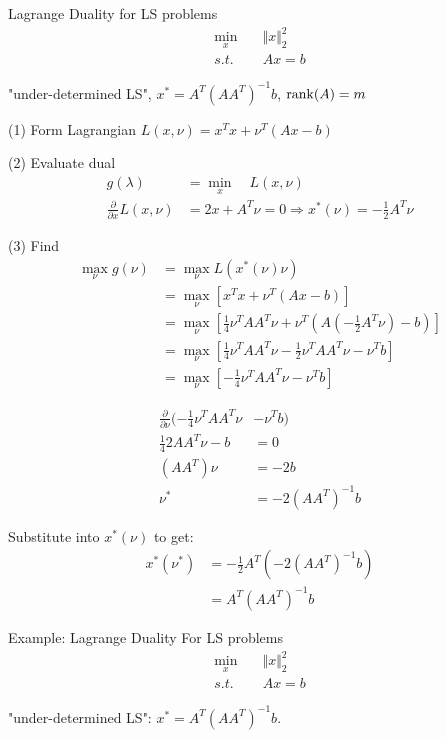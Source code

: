 \begin{example}
	Lagrange Duality for LS problems
	\begin{align*}
		\min_x \quad &\Vert x \Vert_2^2\\
		s.t.\quad &Ax = b
	\end{align*}
	
	"under-determined LS", $x^* = A^T(AA^T)^{-1}b$, $\operatorname{rank}(A) = m$
	
	(1) Form Lagrangian $L(x, \nu) = x^Tx + \nu^T(Ax - b)$
	
	(2) Evaluate dual
	\begin{align*}
		g(\lambda) &= \min_x \quad L(x, \nu)\\
		\frac{\partial}{\partial x} L(x, \nu) &= 2x+A^T\nu = 0\Rightarrow x^*(\nu) = -\frac{1}{2}A^T\nu
	\end{align*}
	
	
	(3) Find
	\begin{align*}
		\max_{\nu} g(\nu) &= \max_{\nu} L(x^*(\nu)\nu)\\
		&= \max_{\nu}[x^Tx + \nu^T(Ax - b)]\\
		&= \max_{\nu}[\frac{1}{4}\nu^TAA^T\nu + \nu^T(A(-\frac{1}{2}A^T\nu)-b)]\\
		&= \max_{\nu}[\frac{1}{4}\nu^TAA^T\nu - \frac{1}{2}\nu^TAA^T\nu - \nu^Tb]\\
		&= \max_{\nu}[-\frac{1}{4}\nu^TAA^T\nu - \nu^Tb]
	\end{align*}
\end{example}

\begin{align*}
	\frac{\partial}{\partial \nu}(-\frac{1}{4}\nu^TAA^T\nu &- \nu^Tb)\\
	\frac{1}{4}2AA^T\nu - b &= 0\\
	(AA^T)\nu &= -2b\\
	\nu^* &= -2(AA^T)^{-1}b
\end{align*}

Substitute into $x^*(\nu)$ to get:
\begin{align*}
	x^*(\nu^*) &= -\frac{1}{2}A^T(-2(AA^T)^{-1}b)\\
	&= A^T(AA^T)^{-1}b
\end{align*}

Example: Lagrange Duality For LS problems
\begin{align*}
	\min_x \quad & \Vert x\Vert^2_2\\
	s.t. \quad & Ax = b
\end{align*}

"under-determined LS": $x^* = A^T(AA^T)^{-1}b$.

